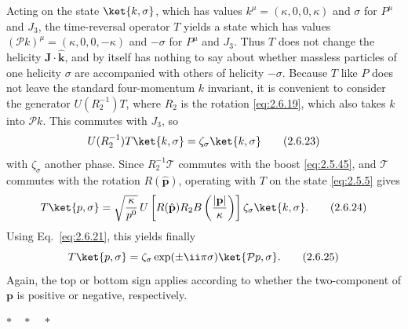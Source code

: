 Acting on the state $\ket{k,\sigma}$, which has values
$k^\mu=(\kappa,0,0,\kappa)$ and $\sigma$ for $P^\mu$ and $J_3$, the
time-reversal operator $T$ yields a state which has values
$(\mathcal{P}k)^\mu=(\kappa,0,0,-\kappa)$ and $-\sigma$ for $P^\mu$ and $J_3$.
Thus $T$ does not change the helicity $\mathbf{J}\cdot\hat{\mathbf{k}}$, and
by itself has nothing to say about whether massless particles of one helicity
$\sigma$ are accompanied with others of helicity $-\sigma$. Because $T$ like
$P$ does not leave the standard four-momentum $k$ invariant, it is convenient
to consider the generator $U(R_2^{-1})T$, where $R_2$ is the rotation
\eqref{eq:2.6.19}, which also takes $k$ into $\mathcal{P}k$. This commutes with $J_3$,
so
\begin{equation}
U(R_2^{-1})T\ket{k,\sigma}=\zeta_\sigma\ket{k,\sigma}
\tag{2.6.23}\label{eq:2.6.23}
\end{equation}
with $\zeta_\sigma$ another phase. Since $R_2^{-1}\mathcal{T}$ commutes with
the boost \eqref{eq:2.5.45}, and $\mathcal{T}$ commutes with the rotation
$R(\hat{\mathbf{p}})$, operating with $T$ on the state \eqref{eq:2.5.5} gives
\begin{equation}
T\ket{p,\sigma}
=\sqrt{\frac{\kappa}{p^0}}\,
U\left[R(\hat{\mathbf{p}})R_2B\left(\frac{|\mathbf{p}|}{\kappa}\right)\right]
\zeta_\sigma\ket{k,\sigma}.
\tag{2.6.24}\label{eq:2.6.24}
\end{equation}
Using Eq.~\eqref{eq:2.6.21}, this yields finally
\begin{equation}
T\ket{p,\sigma}
=\zeta_\sigma\exp(\pm \ii\pi\sigma)\ket{\mathcal{P}p,\sigma}.
\tag{2.6.25}\label{eq:2.6.25}
\end{equation}
Again, the top or bottom sign applies according to whether the two-component
of $\mathbf{p}$ is positive or negative, respectively.

\begin{center}
$*\quad *\quad *$
\end{center}

